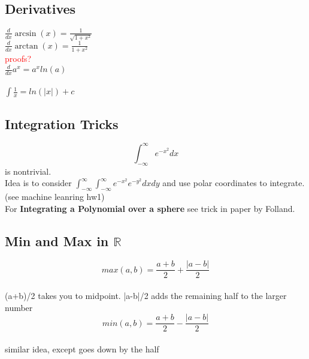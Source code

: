 \documentclass[a4paper, 12pt]{article}
\def\R{\ensuremath{\mathbb{R}}} %
\newcommand{\gray}[1]{\textcolor[gray]{0.5}{#1}} %
\begin{document}
\subsection*{Derivatives}
$\displaystyle \frac{d}{dx} \arcsin(x) = \frac{1}{\sqrt{1+x^2}}$\\
$\displaystyle \frac{d}{dx} \arctan(x) = \frac{1}{1+x^2}$\\
\textcolor{red}{proofs?}\\

\noindent $\displaystyle \frac{d}{dx} a^x = a^x ln(a)$\\
\ \\
$\displaystyle \int \frac{1}{x} = ln(|x|) + c$ \\

\subsection*{Integration Tricks}

$$\int_{- \infty}^\infty e^{-x^2} dx$$
is nontrivial.\\
Idea is to consider $\int_{- \infty}^\infty\int_{- \infty}^\infty e^{-x^2}e^{-y^2} dx dy$ and use polar coordinates to integrate.\\
(see machine leanring hw1)\\

For \textbf{Integrating a Polynomial over a sphere} see trick in paper by Folland.

\subsection*{Min and Max in $\R$}

$$max(a, b) = \frac{a+b}{2} + \frac{|a-b|}{2}$$\\
\gray{(a+b)/2 takes you to midpoint. |a-b|/2 adds the remaining half to the larger number}\\

$$min(a, b) = \frac{a+b}{2} - \frac{|a-b|}{2}$$ \\
\gray{similar idea, except goes down by the half}
\end{document}
